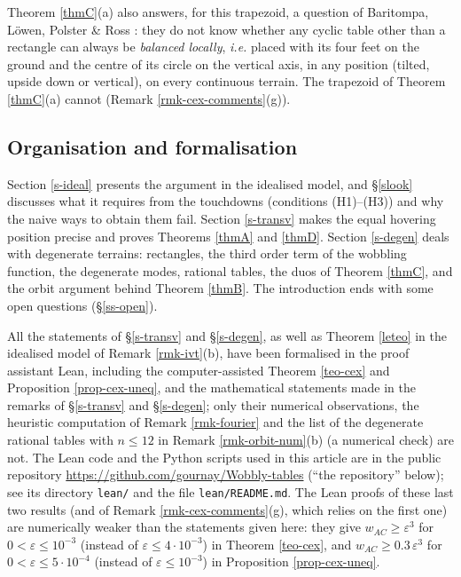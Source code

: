 \documentclass[a4paper,11pt,twoside,leqno]{article}
\newcommand{\ie}[0]{\emph{i.e.} }
\newcommand{\eps}[0]{\varepsilon}
\numberwithin{equation}{section}
\begin{document}
Theorem \ref{thmC}(a) also answers, for this trapezoid, a question of Baritompa, L\"owen, Polster \& Ross \cite[\S{}4]{BLPR}: they do not know whether any cyclic table other than a rectangle can always be \emph{balanced locally}, \ie placed with its four feet on the ground and the centre of its circle on the vertical axis, in any position (tilted, upside down or vertical), on every continuous terrain. The trapezoid of Theorem \ref{thmC}(a) cannot (Remark \ref{rmk-cex-comments}(g)).

\subsection{Organisation and formalisation}

Section \ref{s-ideal} presents the argument in the idealised model, and \S{}\ref{slook} discusses what it requires from the touchdowns (conditions (H1)--(H3)) and why the naive ways to obtain them fail. Section \ref{s-transv} makes the equal hovering position precise and proves Theorems \ref{thmA} and \ref{thmD}. Section \ref{s-degen} deals with degenerate terrains: rectangles, the third order term of the wobbling function, the degenerate modes, rational tables, the duos of Theorem \ref{thmC}, and the orbit argument behind Theorem \ref{thmB}. The introduction ends with some open questions (\S{}\ref{ss-open}).

All the statements of \S{}\ref{s-transv} and \S{}\ref{s-degen}, as well as Theorem \ref{leteo} in the idealised model of Remark \ref{rmk-ivt}(b), have been formalised in the proof assistant Lean, including the computer-assisted Theorem \ref{teo-cex} and Proposition \ref{prop-cex-uneq}, and the mathematical statements made in the remarks of \S{}\ref{s-transv} and \S{}\ref{s-degen}; only their numerical observations, the heuristic computation of Remark \ref{rmk-fourier} and the list of the degenerate rational tables with $n \leq 12$ in Remark \ref{rmk-orbit-num}(b) (a numerical check) are not. The Lean code and the Python scripts used in this article are in the public repository \url{https://github.com/gournay/Wobbly-tables} (``the repository'' below); see its directory \texttt{lean/} and the file \texttt{lean/README.md}. The Lean proofs of these last two results (and of Remark \ref{rmk-cex-comments}(g), which relies on the first one) are numerically weaker than the statements given here: they give $w_{AC} \geq \eps^3$ for $0 < \eps \leq 10^{-3}$ (instead of $\eps \leq 4 \cdot 10^{-3}$) in Theorem \ref{teo-cex}, and $w_{AC} \geq 0.3\, \eps^3$ for $0 < \eps \leq 5 \cdot 10^{-4}$ (instead of $\eps \leq 10^{-3}$) in Proposition \ref{prop-cex-uneq}.
\end{document}
